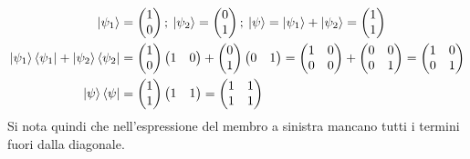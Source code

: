 \documentclass[../../FisicaTeorica.tex]{subfiles}
\begin{document}
\begin{align*}
\ket{\psi_1}&=\begin{pmatrix}
1\\
0
\end{pmatrix};\>\ket{\psi_2} = \begin{pmatrix}
0\\
1
\end{pmatrix};\>\ket{\psi}=\ket{\psi_1}+\ket{\psi_2}=\begin{pmatrix}
1\\
1
\end{pmatrix}\\
\ket{\psi_1}\bra{\psi_1} + \ket{\psi_2}\bra{\psi_2} &= 
\begin{pmatrix}
1\\
0
\end{pmatrix}
\begin{pmatrix}
1 & 0
\end{pmatrix}
+
\begin{pmatrix}
0\\
1
\end{pmatrix}
\begin{pmatrix}
0 & 1
\end{pmatrix} =
\begin{pmatrix}
1 & 0\\
0 & 0
\end{pmatrix}
+ \begin{pmatrix}
0 & 0\\
0 & 1
\end{pmatrix}
= \begin{pmatrix}
1 & 0\\
0 & 1
\end{pmatrix}\\
\ket{\psi}\bra{\psi} &=
\begin{pmatrix}
1\\
1
\end{pmatrix}
\begin{pmatrix}
1 & 1
\end{pmatrix}
=
\begin{pmatrix}
1 & 1\\
1 & 1
\end{pmatrix}
\end{align*}
Si nota quindi che nell'espressione del membro a sinistra mancano tutti i termini fuori dalla diagonale.\\
\end{document}
